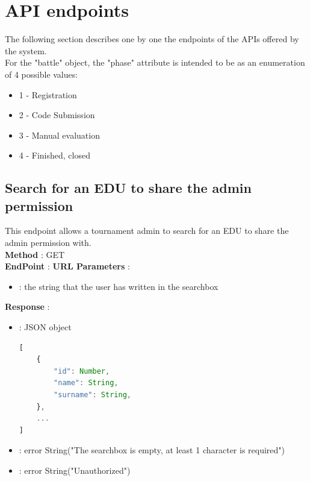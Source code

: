 \section{API endpoints}

\lstset{
    basicstyle=\ttfamily\footnotesize,
    showstringspaces=false,
    tabsize=2,
    breaklines=true
}

The following section describes one by one the endpoints of the APIs offered by the system.\\
For the "battle" object, the "phase" attribute is intended to be as an enumeration of 4 possible values:
\begin{itemize}
    \item 1 - Registration
    \item 2 - Code Submission
    \item 3 - Manual evaluation
    \item 4 - Finished, closed
\end{itemize}

\subsection*{Search for an EDU to share the admin permission}
This endpoint allows a tournament admin to search for an EDU to share the admin permission with.\\
\textbf{Method} : GET \\
\textbf{EndPoint} : 
\textbf{URL Parameters} :
\begin{itemize}
    \item {} : the string that the user has written in the searchbox\\
\end{itemize}
\textbf{Response} :
\begin{itemize}
    \item {} : JSON object
          \begin{lstlisting}[language=JavaScript, label={lst:jscode}, basicstyle=\ttfamily]
[
    {
        "id": Number,
        "name": String,
        "surname": String,
    },
    ...
]
            \end{lstlisting}
    \item {} : error String("The searchbox is empty, at least 1 character is required")
    \item {} : error String("Unauthorized")
\end{itemize}

